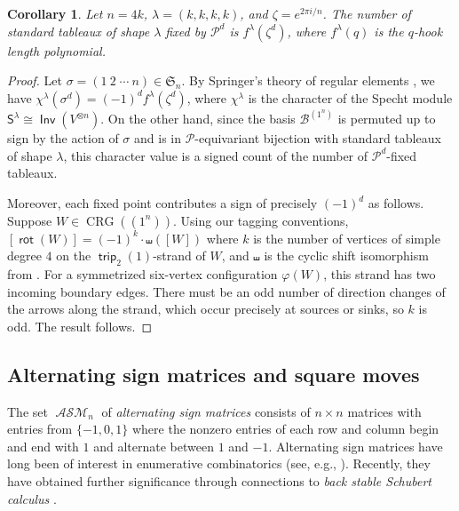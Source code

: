 \documentclass{amsart}
\newtheorem{corollary}[theorem]{Corollary}
\theoremstyle{definition}
\theoremstyle{remark}
\numberwithin{equation}{section}
\DeclareMathOperator{\trip}{\mathsf{trip}}
\DeclareMathOperator{\ASM}{\mathcal{ASM}}
\DeclareMathOperator{\Inv}{\mathsf{Inv}}
\DeclareMathOperator{\rot}{\mathsf{rot}}
\DeclareMathOperator{\crg}{CRG}
\newcommand{\symm}{symmetrized }
\begin{document}
\begin{corollary}
\label{cor:cyclic-sieving}
Let $n = 4k$, $\lambda=(k,k,k,k)$, and $\zeta=e^{2 \pi i/ n}$. The number of standard tableaux of shape $\lambda$ fixed by $\mathcal{P}^{d}$ is $f^{\lambda}(\zeta^d)$, where $f^{\lambda}(q)$ is the $q$-hook length polynomial.
\end{corollary}
\begin{proof}
Let $\sigma=(1 \: 2 \; \cdots \: n) \in \mathfrak{S}_{n}$. By Springer's theory of regular elements \cite[Prop. 4.5]{Springer}, we have $\chi^{\lambda}(\sigma^d)=(-1)^df^{\lambda}(\zeta^d)$, where $\chi^{\lambda}$ is the character of the Specht module $\mathsf{S}^{\lambda} \cong \Inv(V^{\otimes n})$. On the other hand, since the basis $\mathscr{B}^{(1^{n})}$ is permuted up to sign by the action of $\sigma$ and is in $\mathcal{P}$-equivariant bijection with standard tableaux of shape $\lambda$, this character value is a signed count of the number of $\mathcal{P}^d$-fixed tableaux.

Moreover, each fixed point contributes a sign of precisely $(-1)^d$ as follows. Suppose $W \in \crg((1^{n}))$. Using our tagging conventions, $[\rot(W)] = (-1)^k \cdot \shuffle([W])$ where $k$ is the number of vertices of simple degree $4$ on the $\trip_2(1)$-strand of $W$, and $\shuffle$ is the cyclic shift isomorphism from . For a \symm six-vertex configuration $\varphi(W)$, this strand has two incoming boundary edges. There must be an odd number of direction changes of the arrows along the strand, which occur precisely at sources or sinks, so $k$ is odd. The result follows.
\end{proof}

\subsection{Alternating sign matrices and square moves}
\label{sec:asm}
The set $\ASM_n$ of \emph{alternating sign matrices} consists of $n \times n$ matrices with entries from $\{-1, 0, 1\}$ where the nonzero entries of each row and column begin and end with $1$ and alternate between $1$ and $-1$. Alternating sign matrices have long been of interest in enumerative combinatorics (see, e.g., \cite{Mills.Robbins.Rumsey, Zeilberger, Kuperberg_ASM_pf, ProppManyFaces,Kuperberg:roof}). Recently, they have obtained further significance through connections \cite{Weigandt} to \emph{back stable Schubert calculus} \cite{Lam.Lee.Shimozono}.
\end{document}
